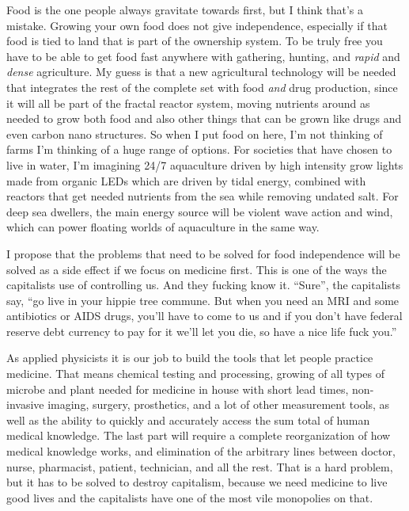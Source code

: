 Food is the one people always gravitate towards first, but I think
that's a mistake. Growing your own food does not give independence,
especially if that food is tied to land that is part of the ownership
system. To be truly free you have to be able to get food fast anywhere
with gathering, hunting, and \emph{rapid} and \emph{dense} agriculture.
My guess is that a new agricultural technology will be needed that
integrates the rest of the complete set with food \emph{and} drug
production, since it will all be part of the fractal reactor system,
moving nutrients around as needed to grow both food and also other
things that can be grown like drugs and even carbon nano structures. So
when I put food on here, I'm not thinking of farms I'm thinking of a
huge range of options. For societies that have chosen to live in water,
I'm imagining 24/7 aquaculture driven by high intensity grow lights made
from organic LEDs which are driven by tidal energy, combined with
reactors that get needed nutrients from the sea while removing undated
salt. For deep sea dwellers, the main energy source will be violent wave
action and wind, which can power floating worlds of aquaculture in the
same way.

I propose that the problems that need to be solved for food independence
will be solved as a side effect if we focus on medicine first. This is
one of the ways the capitalists use of controlling us. And they fucking
know it. ``Sure'', the capitalists say, ``go live in your hippie tree
commune. But when you need an MRI and some antibiotics or AIDS drugs,
you'll have to come to us and if you don't have federal reserve debt
currency to pay for it we'll let you die, so have a nice life fuck
you.''

As applied physicists it is our job to build the tools that let people
practice medicine. That means chemical testing and processing, growing
of all types of microbe and plant needed for medicine in house with
short lead times, non-invasive imaging, surgery, prosthetics, and a lot
of other measurement tools, as well as the ability to quickly and
accurately access the sum total of human medical knowledge. The last
part will require a complete reorganization of how medical knowledge
works, and elimination of the arbitrary lines between doctor, nurse,
pharmacist, patient, technician, and all the rest. That is a hard
problem, but it has to be solved to destroy capitalism, because we need
medicine to live good lives and the capitalists have one of the most
vile monopolies on that.

